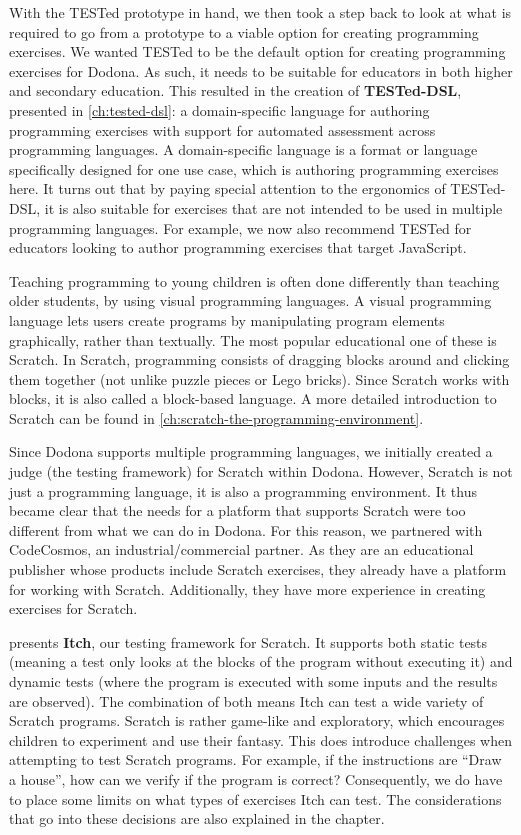 \documentclass[main]{subfiles}
\begin{document}
With the TESTed prototype in hand, we then took a step back to look at what is required to go from a prototype to a viable option for creating programming exercises.
We wanted TESTed to be the default option for creating programming exercises for Dodona.
As such, it needs to be suitable for educators in both higher and secondary education.
This resulted in the creation of \textbf{TESTed-DSL}, presented in \cref{ch:tested-dsl}: a domain-specific language for authoring programming exercises with support for automated assessment across programming languages.
A domain-specific language is a format or language specifically designed for one use case, which is authoring programming exercises here.
It turns out that by paying special attention to the ergonomics of TESTed-DSL, it is also suitable for exercises that are not intended to be used in multiple programming languages.
For example, we now also recommend TESTed for educators looking to author programming exercises that target JavaScript.

Teaching programming to young children is often done differently than teaching older students, by using visual programming languages.
A visual programming language lets users create programs by manipulating program elements graphically, rather than textually.
The most popular educational one of these is Scratch.
In Scratch, programming consists of dragging blocks around and clicking them together (not unlike puzzle pieces or Lego bricks).
Since Scratch works with blocks, it is also called a block-based language.
A more detailed introduction to Scratch can be found in \cref{ch:scratch-the-programming-environment}.

Since Dodona supports multiple programming languages, we initially created a judge (the testing framework) for Scratch within Dodona.
However, Scratch is not just a programming language, it is also a programming environment.
It thus became clear that the needs for a platform that supports Scratch were too different from what we can do in Dodona.
For this reason, we partnered with CodeCosmos, an industrial/commercial partner.
As they are an educational publisher whose products include Scratch exercises, they already have a platform for working with Scratch.
Additionally, they have more experience in creating exercises for Scratch.

 presents \textbf{Itch}, our testing framework for Scratch.
It supports both static tests (meaning a test only looks at the blocks of the program without executing it) and dynamic tests (where the program is executed with some inputs and the results are observed).
The combination of both means Itch can test a wide variety of Scratch programs.
Scratch is rather game-like and exploratory, which encourages children to experiment and use their fantasy.
This does introduce challenges when attempting to test Scratch programs.
For example, if the instructions are ``Draw a house'', how can we verify if the program is correct?
Consequently, we do have to place some limits on what types of exercises Itch can test.
The considerations that go into these decisions are also explained in the chapter.
\end{document}
